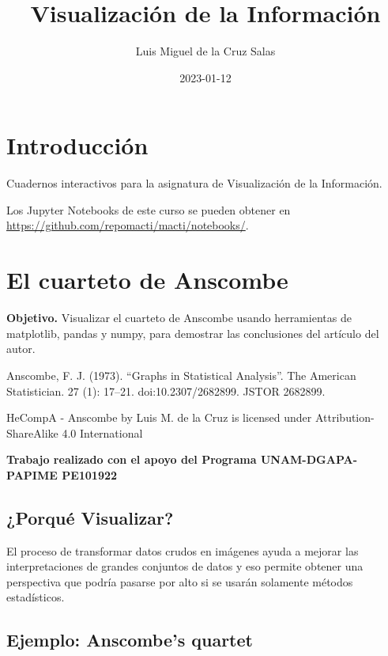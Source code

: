 \documentclass[
  letterpaper,
  DIV=11,
  numbers=noendperiod]{scrreprt}
\title{Visualización de la Información}
\author{Luis Miguel de la Cruz Salas}
\date{2023-01-12}
\renewcommand*\contentsname{Table of contents}
\newcommand\contentsname{Table of contents}
\begin{document}
\maketitle

\renewcommand*\contentsname{Table of contents}
{
\hypersetup{linkcolor=}
\setcounter{tocdepth}{2}
\tableofcontents
}

\chapter*{Introducción}\label{introducciuxf3n}


Cuadernos interactivos para la asignatura de Visualización de la
Información.

Los Jupyter Notebooks de este curso se pueden obtener en
\url{https://github.com/repomacti/macti/notebooks/}.


\chapter{El cuarteto de Anscombe}\label{el-cuarteto-de-anscombe}

\textbf{Objetivo.} Visualizar el cuarteto de Anscombe usando
herramientas de matplotlib, pandas y numpy, para demostrar las
conclusiones del artículo del autor.

Anscombe, F. J. (1973). ``Graphs in Statistical Analysis''. The American
Statistician. 27 (1): 17--21. doi:10.2307/2682899. JSTOR 2682899.

HeCompA - Anscombe by Luis M. de la Cruz is licensed under
Attribution-ShareAlike 4.0 International

\textbf{Trabajo realizado con el apoyo del Programa UNAM-DGAPA-PAPIME
PE101922}

\section{¿Porqué Visualizar?}\label{porquuxe9-visualizar}

El proceso de transformar datos crudos en imágenes ayuda a mejorar las
interpretaciones de grandes conjuntos de datos y eso permite obtener una
perspectiva que podría pasarse por alto si se usarán solamente métodos
estadísticos.

\section{Ejemplo: Anscombe's quartet}\label{ejemplo-anscombes-quartet}
\end{document}

